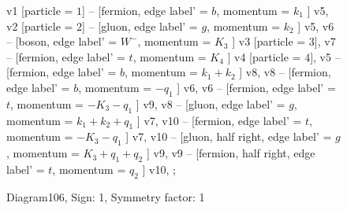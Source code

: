 \documentclass{revtex4}
\begin{document}
\begin{figure}[!htb]
\begin{center}
{    %
v1 [particle = \(1\)] -- [fermion, edge label' = \(b\), momentum = \(k_{1}\) ] v5, 
v2 [particle = \(2\)] -- [gluon, edge label' = \(g\), momentum = \(k_{2}\) ] v5, 
v6 -- [boson, edge label' = \(W^{-}\), momentum = \(K_{3}\) ] v3 [particle = \(3\)], 
v7 -- [fermion, edge label' = \(t\), momentum = \(K_{4}\) ] v4 [particle = \(4\)], 
v5 -- [fermion, edge label' = \(b\), momentum = \(k_{1} + k_{2}\) ] v8, 
v8 -- [fermion, edge label' = \(b\), momentum = \(-q_{1}\) ] v6, 
v6 -- [fermion, edge label' = \(t\), momentum = \(-K_{3} - q_{1}\) ] v9, 
v8 -- [gluon, edge label' = \(g\), momentum = \(k_{1} + k_{2} + q_{1}\) ] v7, 
v10 -- [fermion, edge label' = \(t\), momentum = \(-K_{3} - q_{1}\) ] v7, 
v10 -- [gluon, half right, edge label' = \(g\), momentum = \(K_{3} + q_{1} + q_{2}\) ] v9, 
v9 -- [fermion, half right, edge label' = \(t\), momentum = \(q_{2}\) ] v10, 
};
\end{center}
\caption{Diagram106, Sign: 1, Symmetry factor: 1}
\end{figure}
\newpage
\end{document}
